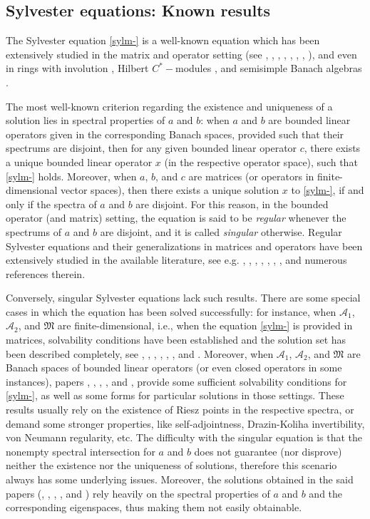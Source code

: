 \documentclass{article}
\theoremstyle{definition}
\def\A{{\mathcal{A}}}
\def\M{\mathfrak{M}}
\begin{document}
\subsection{Sylvester equations: Known results}

The Sylvester equation \eqref{sylm-} is a well-known equation which has been extensively studied in the matrix and operator setting (see \cite{R2}, \cite{RBPR}, \cite{RBMU}, \cite{MD}, \cite{SGL}, \cite{RW}, \cite{JJS}, \cite{HWXSJH}), and even in rings with involution \cite{MGLD}, Hilbert $C^*-$modules  \cite{ZMREMMFM}, and semisimple Banach algebras \cite{AS}.

The most well-known criterion regarding the existence and uniqueness of a solution lies in spectral properties of $a$ and $b$: when $a$ and $b$ are bounded linear operators given in the corresponding Banach spaces, provided such that their spectrums are disjoint, then for any given bounded linear operator $c$, there exists a unique bounded linear operator $x$ (in the respective operator space), such that \eqref{sylm-} holds. Moreover, when $a$, $b$, and $c$ are matrices (or operators in finite-dimensional vector spaces), then there exists a unique solution $x$ to \eqref{sylm-}, if and only if the spectra of $a$ and $b$ are disjoint. For this reason, in the bounded operator (and matrix) setting, the equation is said to be \emph{regular} whenever the spectrums of $a$ and $b$ are disjoint, and it is called \emph{singular} otherwise.  Regular Sylvester equations and their generalizations in matrices and operators have been extensively studied in the available literature, see e.g.  \cite{R2}, \cite{RBPR}, \cite{RBMU}, \cite{MD}, \cite{RW}, \cite{JJS}, \cite{HWXSJH}, and numerous references therein.

 Conversely, singular Sylvester equations lack such results. There are some special cases in which the equation has been solved successfully: for instance, when $\A_1$, $\A_2$, and $\M$ are finite-dimensional, i.e., when the equation \eqref{sylm-} is provided in matrices, solvability conditions have been established and the solution set has been described completely,  see \cite{ECLHDS}, \cite{DIN}, \cite{BDND1}, \cite{FRG}, \cite{GW}, \cite{REH}, and \cite{ASMD}. Moreover, when $\A_1$, $\A_2$, and $\M$ are Banach spaces of bounded linear operators (or even closed operators in some instances), papers \cite{BL}, \cite{BD2}, \cite{BDD2},  \cite{ZMREMMFM}, and \cite{HWXSJH}, provide some sufficient solvability conditions for \eqref{sylm-}, as well as some forms for particular solutions in those settings. These results usually rely on the existence of Riesz points in the respective spectra, or demand some stronger properties, like self-adjointness, Drazin-Koliha invertibility, von Neumann regularity, etc.  The difficulty with the singular equation is that the nonempty spectral intersection for $a$ and $b$ does not guarantee (nor disprove) neither the existence nor the uniqueness of solutions, therefore this scenario always has some underlying issues. Moreover, the solutions obtained in the said papers (\cite{BD1}, \cite{BD2}, \cite{BDD2},  \cite{ZMREMMFM}, and \cite{HWXSJH}) rely heavily on the spectral properties of $a$ and $b$ and the corresponding eigenspaces, thus making them not easily obtainable. 
\end{document}
